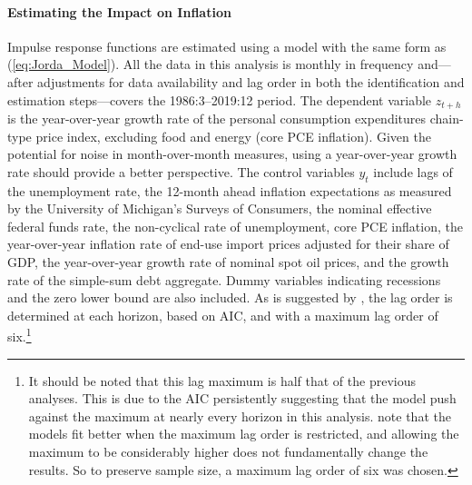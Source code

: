\documentclass[11pt,a4paper,margin=1.5in]{article}
\begin{document}
\paragraph{Estimating the Impact on Inflation}
Impulse response functions are estimated using a model with the same form as (\ref{eq:Jorda_Model}).
All the data in this analysis is monthly in frequency and---after adjustments for data availability and lag order in both the identification and estimation steps---covers the 1986:3--2019:12 period.
The dependent variable $z_{t+h}$ is the year-over-year growth rate of the personal consumption expenditures chain-type price index, excluding food and energy (core PCE inflation).
Given the potential for noise in month-over-month measures, using a year-over-year growth rate should provide a better perspective.
The control variables $y_t$ include lags of the unemployment rate, the 12-month ahead inflation expectations as measured by the University of Michigan's Surveys of Consumers, the nominal effective federal funds rate, the non-cyclical rate of unemployment, core PCE inflation, the year-over-year inflation rate of end-use import prices adjusted for their share of GDP, the year-over-year growth rate of nominal spot oil prices, and the growth rate of the simple-sum debt aggregate. 
Dummy variables indicating recessions and the zero lower bound are also included.
As is suggested by \citet{Kilian-Kim:2011}, the lag order is determined at each horizon, based on AIC, and with a maximum lag order of six.\footnote{
	It should be noted that this lag maximum is half that of the previous analyses.
	This is due to the AIC persistently suggesting that the model push against the maximum at nearly every horizon in this analysis.
	\citet{Kilian-Kim:2011} note that the models fit better when the maximum lag order is restricted, and allowing the maximum to be considerably higher does not fundamentally change the results.
	So to preserve sample size, a maximum lag order of six was chosen.}

\end{document}
